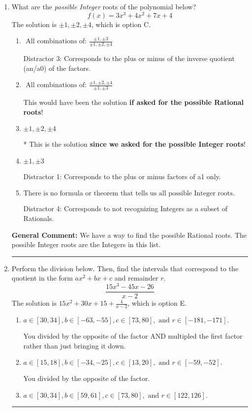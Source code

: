 \documentclass{extbook}[14pt]
\newcommand{\litem}[1]{\item #1

\rule{\textwidth}{0.4pt}}
\begin{document}
\begin{enumerate}\litem{
What are the \textit{possible Integer} roots of the polynomial below?
\[ f(x) = 3x^{3} +4 x^{2} +7 x + 4 \]The solution is \( \pm 1,\pm 2,\pm 4 \), which is option C.\begin{enumerate}[label=\Alph*.]
\item \( \text{ All combinations of: }\frac{\pm 1,\pm 3}{\pm 1,\pm 2,\pm 4} \)

 Distractor 3: Corresponds to the plus or minus of the inverse quotient (an/a0) of the factors. 
\item \( \text{ All combinations of: }\frac{\pm 1,\pm 2,\pm 4}{\pm 1,\pm 3} \)

This would have been the solution \textbf{if asked for the possible Rational roots}!
\item \( \pm 1,\pm 2,\pm 4 \)

* This is the solution \textbf{since we asked for the possible Integer roots}!
\item \( \pm 1,\pm 3 \)

 Distractor 1: Corresponds to the plus or minus factors of a1 only.
\item \( \text{There is no formula or theorem that tells us all possible Integer roots.} \)

 Distractor 4: Corresponds to not recognizing Integers as a subset of Rationals.
\end{enumerate}

\textbf{General Comment:} We have a way to find the possible Rational roots. The possible Integer roots are the Integers in this list.
}
\litem{
Perform the division below. Then, find the intervals that correspond to the quotient in the form $ax^2+bx+c$ and remainder $r$.
\[ \frac{15x^{3} -45 x -26}{x -2} \]The solution is \( 15x^{2} +30 x + 15 + \frac{4}{x -2} \), which is option E.\begin{enumerate}[label=\Alph*.]
\item \( a \in [30, 34], b \in [-63, -55], c \in [73, 80], \text{ and } r \in [-181, -171]. \)

 You divided by the opposite of the factor AND multipled the first factor rather than just bringing it down.
\item \( a \in [15, 18], b \in [-34, -25], c \in [13, 20], \text{ and } r \in [-59, -52]. \)

 You divided by the opposite of the factor.
\item \( a \in [30, 34], b \in [59, 61], c \in [73, 80], \text{ and } r \in [122, 126]. \)


\end{enumerate}}
\end{enumerate}
\end{document}
